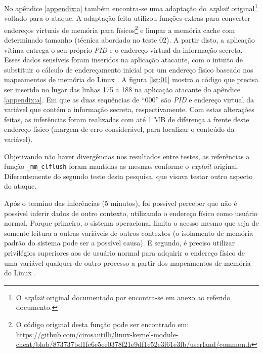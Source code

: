 \documentclass[
	article,			    %
	12pt,				    %
	oneside,			    %
	a4paper,			    %
	chapter=TITLE,		    %
	section=TITLE,		    %
	subsection=TITLE,	    %
	english,			    %
	brazil,				    %
	sumario=tradicional
]{abntex2}
\begin{document}
No apêndice \ref{appendix:a} também encontra-se uma adaptação do \emph{exploit} original\footnote{O \emph{exploit} original documentado por  encontra-se em anexo ao referido documento.} voltado para o ataque. A adaptação feita utilizou funções extras para converter endereços virtuais de memória para físicos\footnote{O código original desta função pode ser encontrado em: \url{https://github.com/cirosantilli/linux-kernel-module-cheat/blob/873737bd1fc6e5ee0378f21e9df1c52e3f61e3fb/userland/common.h}} e limpar a memória cache com determinado tamanho (técnica abordado no teste 02). A partir disto, a aplicação vítima entrega o seu próprio \emph{PID} e o endereço virtual da informação secreta. Esses dados sensíveis foram inseridos na aplicação atacante, com o intuito de substituir o cálculo de endereçamento inicial por um endereço físico baseado nos mapeamentos de memória do Linux \cite{EQWARE2009Capturing}. A figura \ref{lst:01} mostra o código que precisa ser inserido no lugar das linhas 175 a 188 na aplicação atacante do apêndice \ref{appendix:a}. Em que as duas sequências de ``000'' são \emph{PID} e endereço virtual da variável que contém a informação secreta, respectivamente. Com estas alterações feitas, as inferências foram realizadas com até 1 MB de diferença a frente deste endereço físico (margem de erro considerável, para localizar o conteúdo da variável).

Objetivando não haver divergências nos resultados entre testes, as referências a função \lstinline[language=C, style=c]{_mm_clflush} foram mantidas as mesmas conforme o \emph{exploit} original. Diferentemente do segundo teste desta pesquisa, que visava testar outro aspecto do ataque.



Após o termino das inferências (5 minutos), foi possível perceber que não é possível inferir dados de outro contexto, utilizando o endereço físico como usuário normal. Porque primeiro, o sistema operacional limita o acesso mesmo que seja de somente leitura a outras variáveis de outros contextos (o isolamento de memória padrão do sistema pode ser a possível causa). E segundo, é preciso utilizar privilégios superiores aos de usuário normal para adquirir o endereço físico de uma variável qualquer de outro processo a partir dos mapeamentos de memória do Linux \cite{EQWARE2009Capturing}.

\end{document}
